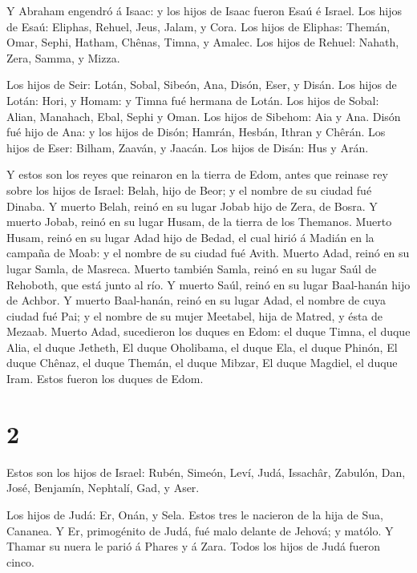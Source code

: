  Y Abraham engendró á Isaac: y los hijos de Isaac fueron
Esaú é Israel.  Los hijos de Esaú: Eliphas, Rehuel, Jeus,
Jalam, y Cora.  Los hijos de Eliphas: Themán, Omar, Sephi,
Hatham, Chênas, Timna, y Amalec.  Los hijos de Rehuel:
Nahath, Zera, Samma, y Mizza.

 Los hijos de Seir: Lotán, Sobal, Sibeón, Ana, Disón, Eser,
y Disán.  Los hijos de Lotán: Hori, y Homam: y Timna fué
hermana de Lotán.  Los hijos de Sobal: Alian, Manahach,
Ebal, Sephi y Oman. Los hijos de Sibehom: Aia y Ana.  Disón
fué hijo de Ana: y los hijos de Disón; Hamrán, Hesbán, Ithran y Chêrán.
 Los hijos de Eser: Bilham, Zaaván, y Jaacán. Los hijos de
Disán: Hus y Arán.

 Y estos son los reyes que reinaron en la tierra de Edom,
antes que reinase rey sobre los hijos de Israel: Belah, hijo de Beor; y
el nombre de su ciudad fué Dinaba.  Y muerto Belah, reinó
en su lugar Jobab hijo de Zera, de Bosra.  Y muerto Jobab,
reinó en su lugar Husam, de la tierra de los Themanos. 
Muerto Husam, reinó en su lugar Adad hijo de Bedad, el cual hirió á
Madián en la campaña de Moab: y el nombre de su ciudad fué Avith.
 Muerto Adad, reinó en su lugar Samla, de Masreca.
 Muerto también Samla, reinó en su lugar Saúl de Rehoboth,
que está junto al río.  Y muerto Saúl, reinó en su lugar
Baal-hanán hijo de Achbor.  Y muerto Baal-hanán, reinó en
su lugar Adad, el nombre de cuya ciudad fué Pai; y el nombre de su mujer
Meetabel, hija de Matred, y ésta de Mezaab.  Muerto Adad,
sucedieron los duques en Edom: el duque Timna, el duque Alia, el duque
Jetheth,  El duque Oholibama, el duque Ela, el duque
Phinón,  El duque Chênaz, el duque Themán, el duque Mibzar,
 El duque Magdiel, el duque Iram. Estos fueron los duques
de Edom.

\hypertarget{section-1}{%
\section{2}\label{section-1}}

 Estos son los hijos de Israel: Rubén, Simeón, Leví, Judá,
Issachâr, Zabulón,  Dan, José, Benjamín, Nephtalí, Gad, y
Aser.

 Los hijos de Judá: Er, Onán, y Sela. Estos tres le nacieron
de la hija de Sua, Cananea. Y Er, primogénito de Judá, fué malo delante
de Jehová; y matólo.  Y Thamar su nuera le parió á Phares y
á Zara. Todos los hijos de Judá fueron cinco.


